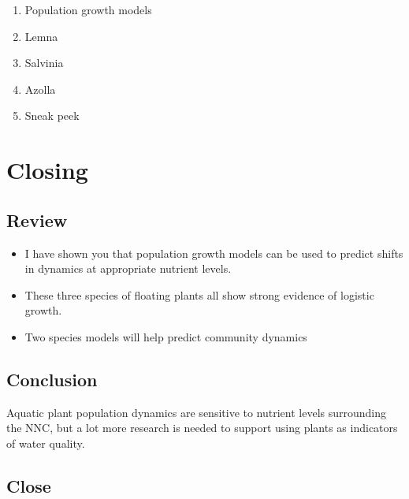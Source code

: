 \documentclass[12pt]{amsart}
\begin{document}
\begin{enumerate}
\item Population growth models
\item Lemna
\item Salvinia
\item Azolla
\item Sneak peek
\end{enumerate}


\section{Closing}

\subsection{Review}
\begin{itemize}
\item I have shown you that population growth models can be used to predict shifts in dynamics at appropriate nutrient levels. 
\item These three species of floating plants all show strong evidence of logistic growth. 
\item Two species models will help predict community dynamics
\end{itemize}
\subsection{Conclusion}
Aquatic plant population dynamics are sensitive to nutrient levels surrounding the NNC, but a lot more research is needed to support using plants as indicators of water quality. 

\subsection{Close}
\end{document}
